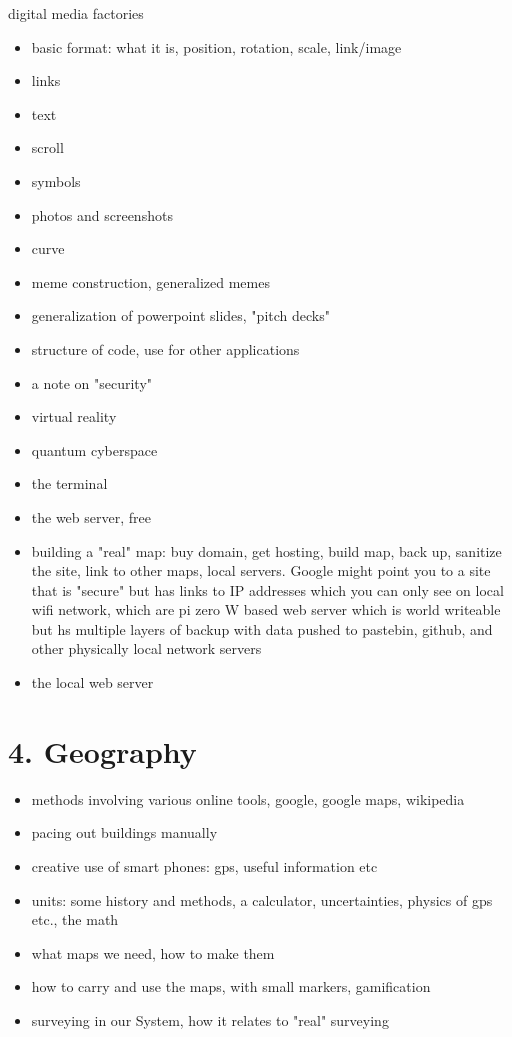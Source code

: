 \documentclass[11pt]{article}
\begin{document}
digital media factories


\begin{itemize}

\item
basic format: what it is, position, rotation, scale, link/image
\item
links
\item
text
\item
scroll
\item
symbols
\item
photos and screenshots
\item
curve
\item
meme construction, generalized memes
\item
generalization of powerpoint slides, "pitch decks"
\item
structure of code, use for other applications
\item
a note on "security"
\item
virtual reality
\item
quantum cyberspace
\item
the terminal
\item
the web server, free
\item
building a "real" map: buy domain, get hosting, build map, back up, sanitize the site, link to other maps, local servers.  Google might point you to a site that is "secure" but has links to IP addresses which you can only see on local wifi network, which are pi zero W based web server which is world writeable but hs multiple layers of backup with data pushed to pastebin, github, and other physically local network servers
\item
the local web server
\end{itemize}

\section{4. Geography}
\begin{itemize}

\item
methods involving various online tools, google, google maps, wikipedia
\item
pacing out buildings manually
\item
creative use of smart phones: gps, useful information etc
\item
units: some history and methods, a calculator, uncertainties, physics of gps etc., the math
\item
what maps we need, how to make them
\item
how to carry and use the maps, with small markers, gamification
\item
surveying in our System, how it relates to "real" surveying
\end{itemize}
\end{document}
